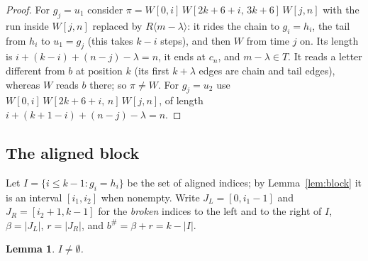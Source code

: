 \documentclass[11pt]{article}
\newtheorem{lemma}[theorem]{Lemma}
\theoremstyle{definition}
\begin{document}
\begin{proof}
For $g_j=u_1$ consider $\pi=W[0,i]\,W[2k+6+i,\,3k+6]\,W[j,n]$ with the run
inside $W[j,n]$ replaced by $R\langle m-\lambda\rangle$: it rides the chain
to $g_i=h_i$, the tail from $h_i$ to $u_1=g_j$ (this takes $k-i$ steps), and
then $W$ from time $j$ on. Its length is $i+(k-i)+(n-j)-\lambda=n$, it ends at
$c_n$, and $m-\lambda\in T$. It reads a letter different from $b$ at position
$k$ (its first $k+\lambda$ edges are chain and tail edges), whereas $W$ reads
$b$ there; so $\pi\ne W$. For $g_j=u_2$ use $W[0,i]\,W[2k+6+i,\,n]\,W[j,n]$,
of length $i+(k+1-i)+(n-j)-\lambda=n$.
\end{proof}

\subsection{The aligned block}\label{sec:block}

Let $I=\{i\le k-1: g_i=h_i\}$ be the set of aligned indices; by
Lemma~\ref{lem:block} it is an interval $[i_1,i_2]$ when nonempty. Write
$J_L=[0,i_1-1]$ and $J_R=[i_2+1,k-1]$ for the \emph{broken} indices to the
left and to the right of $I$, $\beta=|J_L|$, $r=|J_R|$, and
$b^{\#}=\beta+r=k-|I|$.

\begin{lemma}\label{lem:Inonempty}
$I\ne\emptyset$.
\end{lemma}
\end{document}
